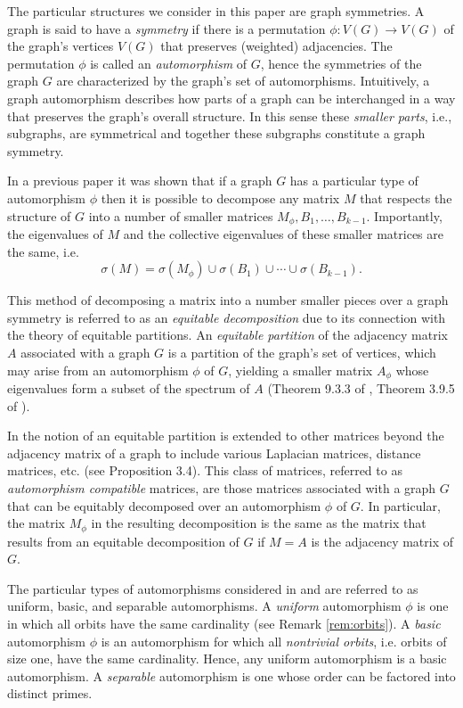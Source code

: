 \documentclass[preprint,12pt]{elsarticle}
\theoremstyle{definition}
\theoremstyle{remark}
\renewcommand{\emph}{\textit}
\begin{document}
The particular structures we consider in this paper are graph symmetries. A graph is said to have a \emph{symmetry} if there is a permutation $\phi: V(G) \to V(G)$ of the graph's vertices $V(G)$ that preserves (weighted) adjacencies. The permutation $\phi$ is called an \emph{automorphism} of $G$, hence the symmetries of the graph $G$ are characterized by the graph's set of automorphisms. Intuitively, a graph automorphism describes how parts of a graph can be interchanged in a way that preserves the graph's overall structure.  In this sense these \emph{smaller parts}, i.e., subgraphs, are symmetrical and together these subgraphs constitute a graph symmetry.

In a previous paper \cite{BFW} it was shown that if a graph $G$ has a particular type of automorphism $\phi$ then it is possible to decompose any matrix $M$ that respects the structure of $G$ into a number of smaller matrices $M_{\phi},B_1,\dots,B_{k-1}$. Importantly, the eigenvalues of $M$ and the collective eigenvalues of these smaller matrices are the same, i.e.
\begin{equation*}\label{eq:first}
\sigma(M)=\sigma(M_{\phi})\cup\sigma(B_1)\cup\cdots\cup\sigma(B_{k-1}).
\end{equation*}

This method of decomposing a matrix into a number smaller pieces over a graph symmetry is referred to as an \emph{equitable decomposition} due to its connection with the theory of equitable partitions. An \emph{equitable partition} of the adjacency matrix $A$ associated with a graph $G$ is a partition of the graph's set of vertices, which may arise from an automorphism $\phi$ of $G$, yielding a smaller matrix $A_{\phi}$ whose eigenvalues form a subset of the spectrum of $A$ (Theorem 9.3.3 of \cite{Godsil} , Theorem 3.9.5 of \cite{cvet}  ).


In \cite{BFW} the notion of an equitable partition is extended to other matrices beyond the adjacency matrix of a graph to include various Laplacian matrices, distance matrices, etc. (see Proposition 3.4).  This class of matrices, referred to as \emph{automorphism compatible} matrices, are those matrices associated with a graph $G$ that can be equitably decomposed over an automorphism $\phi$ of $G$. In particular, the matrix $M_{\phi}$ in the resulting decomposition is the same as the matrix that results from an equitable decomposition of $G$ if $M=A$ is the adjacency matrix of $G$.

The particular types of automorphisms considered in \cite{BFW} and \cite{FSSW} are referred to as uniform,  basic, and separable automorphisms. A \emph{uniform} automorphism $\phi$ is one in which all orbits have the same cardinality (see Remark \ref{rem:orbits}). A \emph{basic} automorphism $\phi$ is an automorphism for which all \emph{nontrivial orbits}, i.e. orbits of size one, have the same cardinality. Hence, any uniform automorphism is a basic automorphism. A \emph{separable} automorphism is one whose order can be factored into distinct primes.
\end{document}
